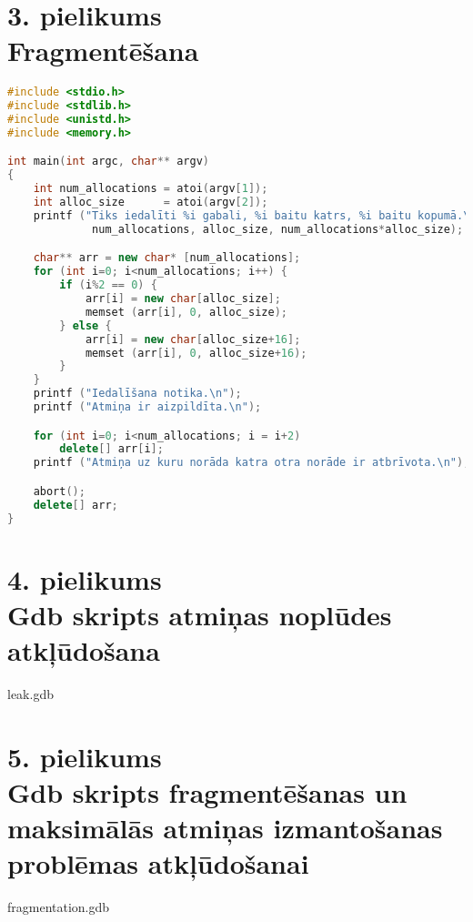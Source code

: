 \newpage
\chapter[3. pielikums. Fragmentēšana] {3. pielikums \\  Fragmentēšana}


\begin{lstlisting}[language=C++]
#include <stdio.h>
#include <stdlib.h>
#include <unistd.h>
#include <memory.h>

int main(int argc, char** argv)
{
	int num_allocations = atoi(argv[1]);
	int alloc_size      = atoi(argv[2]);
	printf ("Tiks iedalīti %i gabali, %i baitu katrs, %i baitu kopumā.\n",
	         num_allocations, alloc_size, num_allocations*alloc_size);

	char** arr = new char* [num_allocations];
	for (int i=0; i<num_allocations; i++) {
		if (i%2 == 0) {
			arr[i] = new char[alloc_size];
			memset (arr[i], 0, alloc_size);
		} else {
			arr[i] = new char[alloc_size+16];
			memset (arr[i], 0, alloc_size+16);
		}
	}
	printf ("Iedalīšana notika.\n");
	printf ("Atmiņa ir aizpildīta.\n");

	for (int i=0; i<num_allocations; i = i+2)
		delete[] arr[i];
	printf ("Atmiņa uz kuru norāda katra otra norāde ir atbrīvota.\n");

	abort();
	delete[] arr;
} 
\end{lstlisting}

\newpage
\chapter[4. pielikums. Gdb skripts atmiņas noplūdes atkļūdošanai] {4. pielikums \\  Gdb skripts atmiņas noplūdes atkļūdošana}
{leak.gdb}

\newpage
\chapter[5. pielikums. Gdb skripts pārējo divu problēmu atkļūdošanai] {5. pielikums \\ Gdb skripts fragmentēšanas un maksimālās atmiņas izmantošanas problēmas atkļūdošanai}
{fragmentation.gdb}
